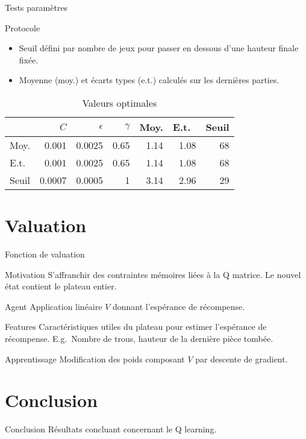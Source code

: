 \documentclass[tikz, footheight=2em]{beamer}
\begin{document}
\begin{frame}[c]{Tests paramètres}
  \begin{block}{Protocole}
    \begin{itemize}
      \item Seuil défini par nombre de jeux pour passer en dessous d'une
        hauteur finale fixée.
      \item Moyenne (moy.) et écarts types (e.t.) calculés sur les dernières
        parties.
    \end{itemize}
  \end{block}
  \pause{}
  \begin{table}
    \centering
    \begin{tabulary}{\linewidth}{|C|r|r|r||r|r|r|}
      \hline
      & \(C\) & \(\epsilon\) & \(\gamma\) & Moy. & E.t.\ & Seuil\\
      \hline
      Moy. & 0.001 & 0.0025 & 0.65 & 1.14 & 1.08 & 68\\
      \hline
      E.t.\ & 0.001 & 0.0025 & 0.65 & 1.14 & 1.08 & 68\\
      \hline
      Seuil & 0.0007 & 0.0005 & 1 & 3.14 & 2.96 & 29\\
      \hline
    \end{tabulary}
    \caption{Valeurs optimales}\label{tab:param}
  \end{table}
\end{frame}


\section{Valuation}
\begin{frame}[c]{Fonction de valuation}
  \begin{block}{Motivation}
    S'affranchir des contraintes mémoires liées à la Q matrice. Le nouvel état
    contient le plateau entier.
  \end{block}
  \pause{}
  \begin{block}{Agent}
    Application linéaire \(V\) donnant l'espérance de récompense.
  \end{block}
  \pause{}
  \begin{exampleblock}{Features}
    Caractéristiques utiles du plateau pour estimer l'espérance de récompense.
    E.g.\ Nombre de trous, hauteur de la dernière pièce tombée.
  \end{exampleblock}
  \pause{}
  \begin{block}{Apprentissage}
    Modification des poids composant \(V\) par descente de gradient.
  \end{block}
\end{frame}

\section*{Conclusion}
\begin{frame}[c]{Conclusion}
  Résultats concluant concernant le Q learning.
\end{frame}
\end{document}
